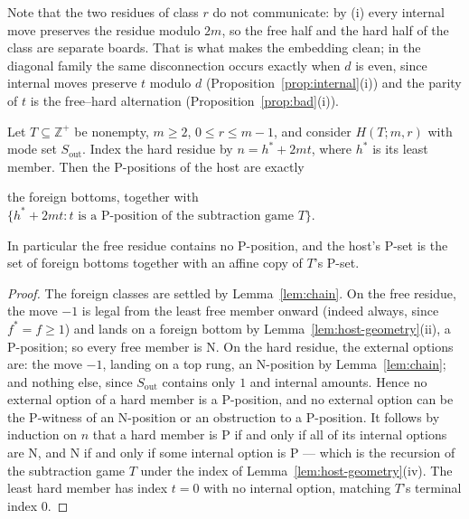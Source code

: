 Note that the two residues of class $r$ do not communicate: by (i) every
internal move preserves the residue modulo $2m$, so the free half and the
hard half of the class are separate boards. That is what makes the
embedding clean; in the diagonal family the same disconnection occurs
exactly when $d$ is even, since internal moves preserve $t$ modulo $d$
(Proposition~\ref{prop:internal}(i)) and the parity of $t$ is the
free--hard alternation (Proposition~\ref{prop:bad}(i)).

\begin{theorem}\label{thm:embed-out}
Let $T \subseteq \mathbb{Z}^+$ be nonempty, $m \ge 2$,
$0 \le r \le m-1$, and consider $H(T; m, r)$ with mode set
$S_{\mathrm{out}}$. Index the hard residue by $n = h^* + 2mt$, where
$h^*$ is its least member. Then the P-positions of the host are exactly

the foreign bottoms, together with
$\{ h^* + 2mt : t \text{ is a P-position of the subtraction game } T \}$.

In particular the free residue contains no P-position, and the host's
P-set is the set of foreign bottoms together with an affine copy of $T$'s
P-set.
\end{theorem}
\begin{proof}
The foreign classes are settled by Lemma~\ref{lem:chain}. On the free
residue, the move $-1$ is legal from the least free member onward
(indeed always, since $f^* = f \ge 1$) and lands on a foreign bottom by
Lemma~\ref{lem:host-geometry}(ii), a P-position; so every free member is
N. On the hard residue, the external options are: the move $-1$, landing
on a top rung, an N-position by Lemma~\ref{lem:chain}; and nothing else,
since $S_{\mathrm{out}}$ contains only $1$ and internal amounts. Hence no
external option of a hard member is a P-position, and no external option
can be the P-witness of an N-position or an obstruction to a P-position.
It follows by induction on $n$ that a hard member is P if and only if all
of its internal options are N, and N if and only if some internal option
is P --- which is the recursion of the subtraction game $T$ under the
index of Lemma~\ref{lem:host-geometry}(iv). The least hard member has
index $t = 0$ with no internal option, matching $T$'s terminal index $0$.
\end{proof}

